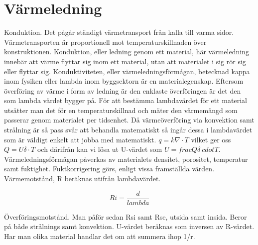 \section{Värmeledning}
Konduktion. Det pågår ständigt värmetransport från kalla till varma sidor. Värmetransporten är proportionell mot temperaturskillnaden över konstruktionen. Konduktion, eller ledning genom ett material, här värmeledning innebär att värme flyttar sig inom ett material, utan att materialet i sig rör sig eller flyttar sig. Konduktiviteten, eller värmeledningsförmågan, betecknad kappa inom fysiken eller lambda inom byggsektorn är en materialegenskap. Eftersom överföring av värme i form av ledning är den enklaste överföringen är det den som lambda värdet bygger på. För att bestämma lambdavärdet för ett material utsätter man det för en temperaturskillnad och mäter den värmemängd som passerar genom materialet per tidsenhet. Då värmeöverföring via konvektion samt strålning är så pass svår att behandla matematiskt så ingår dessa i lambdavärdet som är väldigt enkelt att jobba med matematiskt. $q=k \nabla \cdot T$ vilket ger oss $Q=U \delta \cdot T$ och därifrån kan vi lösa ut U-värdet som $U = frac{Q}{\delta\ cdot T}$. Värmeledningsförmågan påverkas av materialets densitet, porositet, temperatur samt fuktighet. Fuktkorrigering görs, enligt vissa framställda värden. Värmemotstånd, R beräknas utifrån lambdavärdet.

\begin{equation}
Ri=\frac{d}{lambda}
\end{equation}

Överföringsmotstånd. Man påför sedan Rsi samt Rse, utsida samt insida. Beror på både strålnings samt konvektion. U-värdet beräknas som inversen av R-värdet. Har man olika material handlar det om att summera ihop 1/r.
